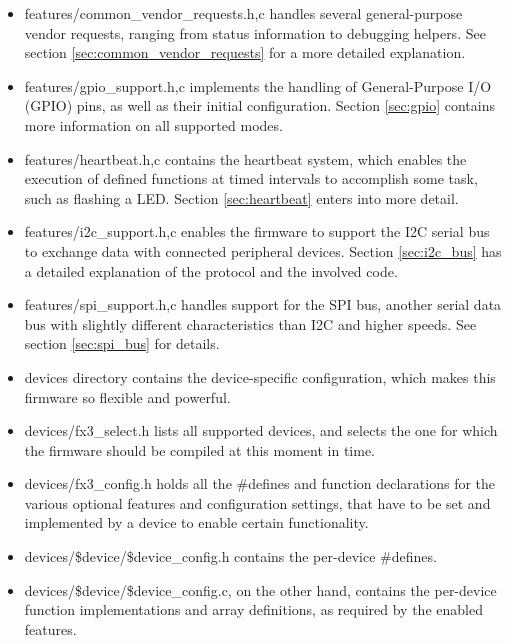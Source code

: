 \documentclass[a4paper,12pt]{report}
\begin{document}
\begin{itemize}
\item{features/common\_vendor\_requests.{h,c}} handles several general-purpose vendor requests, ranging from status information to debugging helpers. See section \ref{sec:common_vendor_requests} for a more detailed explanation.
\item{features/gpio\_support.{h,c}} implements the handling of General-Purpose I/O (GPIO) pins, as well as their initial configuration. Section \ref{sec:gpio} contains more information on all supported modes.
\item{features/heartbeat.{h,c}} contains the heartbeat system, which enables the execution of defined functions at timed intervals to accomplish some task, such as flashing a LED. Section \ref{sec:heartbeat} enters into more detail.
\item{features/i2c\_support.{h,c}} enables the firmware to support the I2C serial bus to exchange data with connected peripheral devices. Section \ref{sec:i2c_bus} has a detailed explanation of the protocol and the involved code.
\item{features/spi\_support.{h,c}} handles support for the SPI bus, another serial data bus with slightly different characteristics than I2C and higher speeds. See section \ref{sec:spi_bus} for details.
\item{devices directory} contains the device-specific configuration, which makes this firmware so flexible and powerful.
\item{devices/fx3\_select.h} lists all supported devices, and selects the one for which the firmware should be compiled at this moment in time.
\item{devices/fx3\_config.h} holds all the \#defines and function declarations for the various optional features and configuration settings, that have to be set and implemented by a device to enable certain functionality.
\item{devices/\$device/\$device\_config.h} contains the per-device \#defines.
\item{devices/\$device/\$device\_config.c}, on the other hand, contains the per-device function implementations and array definitions, as required by the enabled features.
\end{itemize}
\end{document}
